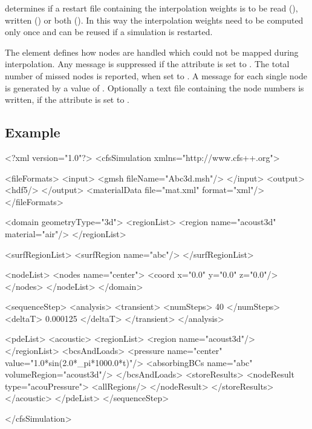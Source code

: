 determines if a restart file containing the
interpolation weights is to be read (), written () or
both
(). In this way the interpolation weights need to be computed only
once and can be reused if a simulation is restarted.

The  element defines how nodes are handled which could not
be mapped during interpolation. Any message is suppressed if the attribute
 is set to . The total number of missed nodes
is
reported, when set to . A message for each single node is
generated
by a value of . Optionally a text file containing the node
numbers is written, if the attribute  is set to
.

\subsection{Example}

{\footnotesize 
\begin{xmllisting}
<?xml version="1.0"?>
<cfsSimulation xmlns="http://www.cfs++.org">

  <fileFormats>
    <input>
      <gmsh fileName="Abc3d.msh"/>
    </input>
    <output>
      <hdf5/>
    </output>
    <materialData file="mat.xml" format="xml"/>
  </fileFormats>
  
  <domain geometryType="3d">
    <regionList>
      <region name="acoust3d" material="air"/>
    </regionList>
    
    <surfRegionList>
      <surfRegion name="abc"/>
    </surfRegionList>
    
    <nodeList>
      <nodes name="center">
        <coord x="0.0" y="0.0" z="0.0"/>
      </nodes>
    </nodeList>
  </domain>
  
  <sequenceStep>
    <analysis>
      <transient>
        <numSteps> 40   </numSteps>
        <deltaT> 0.000125 </deltaT>
      </transient>
    </analysis>
    
    <pdeList>
      <acoustic>
        <regionList>
          <region name="acoust3d"/>
        </regionList>
        <bcsAndLoads>
          <pressure name="center" value="1.0*sin(2.0*_pi*1000.0*t)"/>
          <absorbingBCs name="abc" volumeRegion="acoust3d"/>
        </bcsAndLoads>
        <storeResults>
          <nodeResult type="acouPressure">
            <allRegions/>
          </nodeResult>
        </storeResults>
      </acoustic>
    </pdeList>
  </sequenceStep>
  

</cfsSimulation>
\end{xmllisting}
}


